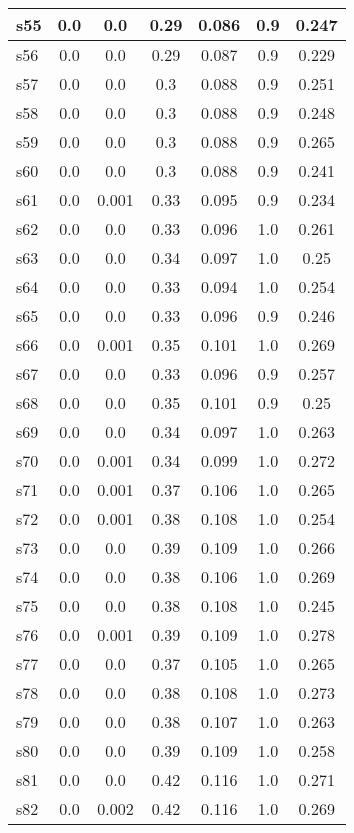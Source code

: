 \documentclass{article}
\begin{document}
\begin{tabular}{|l|c|c|c|c|c|c|}
\hline
s55 &0.0 & 0.0 & 0.29 & 0.086 & 0.9 & 0.247\\
\hline
s56 &0.0 & 0.0 & 0.29 & 0.087 & 0.9 & 0.229\\
\hline
s57 &0.0 & 0.0 & 0.3 & 0.088 & 0.9 & 0.251\\
\hline
s58 &0.0 & 0.0 & 0.3 & 0.088 & 0.9 & 0.248\\
\hline
s59 &0.0 & 0.0 & 0.3 & 0.088 & 0.9 & 0.265\\
\hline
s60 &0.0 & 0.0 & 0.3 & 0.088 & 0.9 & 0.241\\
\hline
s61 &0.0 & 0.001 & 0.33 & 0.095 & 0.9 & 0.234\\
\hline
s62 &0.0 & 0.0 & 0.33 & 0.096 & 1.0 & 0.261\\
\hline
s63 &0.0 & 0.0 & 0.34 & 0.097 & 1.0 & 0.25\\
\hline
s64 &0.0 & 0.0 & 0.33 & 0.094 & 1.0 & 0.254\\
\hline
s65 &0.0 & 0.0 & 0.33 & 0.096 & 0.9 & 0.246\\
\hline
s66 &0.0 & 0.001 & 0.35 & 0.101 & 1.0 & 0.269\\
\hline
s67 &0.0 & 0.0 & 0.33 & 0.096 & 0.9 & 0.257\\
\hline
s68 &0.0 & 0.0 & 0.35 & 0.101 & 0.9 & 0.25\\
\hline
s69 &0.0 & 0.0 & 0.34 & 0.097 & 1.0 & 0.263\\
\hline
s70 &0.0 & 0.001 & 0.34 & 0.099 & 1.0 & 0.272\\
\hline
s71 &0.0 & 0.001 & 0.37 & 0.106 & 1.0 & 0.265\\
\hline
s72 &0.0 & 0.001 & 0.38 & 0.108 & 1.0 & 0.254\\
\hline
s73 &0.0 & 0.0 & 0.39 & 0.109 & 1.0 & 0.266\\
\hline
s74 &0.0 & 0.0 & 0.38 & 0.106 & 1.0 & 0.269\\
\hline
s75 &0.0 & 0.0 & 0.38 & 0.108 & 1.0 & 0.245\\
\hline
s76 &0.0 & 0.001 & 0.39 & 0.109 & 1.0 & 0.278\\
\hline
s77 &0.0 & 0.0 & 0.37 & 0.105 & 1.0 & 0.265\\
\hline
s78 &0.0 & 0.0 & 0.38 & 0.108 & 1.0 & 0.273\\
\hline
s79 &0.0 & 0.0 & 0.38 & 0.107 & 1.0 & 0.263\\
\hline
s80 &0.0 & 0.0 & 0.39 & 0.109 & 1.0 & 0.258\\
\hline
s81 &0.0 & 0.0 & 0.42 & 0.116 & 1.0 & 0.271\\
\hline
s82 &0.0 & 0.002 & 0.42 & 0.116 & 1.0 & 0.269\\

\end{tabular}
\end{document}
